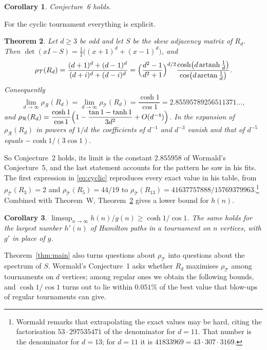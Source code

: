 \documentclass[11pt,a4paper,reqno]{amsart}
\newtheorem{theorem}{Theorem}[section]
\newtheorem{corollary}[theorem]{Corollary}
\theoremstyle{remark}
\numberwithin{equation}{section}
\newcommand{\artanh}{\operatorname{artanh}}
\newcommand{\cT}{\mathcal{T}}
\newcommand{\cR}{\mathcal{R}}
\begin{document}
\begin{corollary}\label{cor:conj6}
Conjecture~6 holds.
\end{corollary}

For the cyclic tournament everything is explicit.

\begin{theorem}\label{thm:cyclic}
Let $d\ge3$ be odd and let $S$ be the skew adjacency matrix of $R_d$. Then $\det(xI-S)=\tfrac12\bigl((x+1)^d+(x-1)^d\bigr)$, and
\begin{equation}\label{eq:cyclic}
\rho_\cT(R_d)=\frac{(d+1)^d+(d-1)^d}{(d+i)^d+(d-i)^d}
=\Bigl(\frac{d^2-1}{d^2+1}\Bigr)^{d/2}\frac{\cosh\bigl(d\artanh\frac1d\bigr)}{\cos\bigl(d\arctan\frac1d\bigr)}.
\end{equation}
Consequently
\[
\lim_{d\to\infty}\rho_\cR(R_d)=\lim_{d\to\infty}\rho_\cT(R_d)=\frac{\cosh 1}{\cos 1}=2.85595789256511371\ldots,
\]
and $\rho_\cR(R_d)=\dfrac{\cosh1}{\cos1}\Bigl(1-\dfrac{\tan1-\tanh1}{3d^2}+O(d^{-4})\Bigr)$. In the expansion of $\rho_\cR(R_d)$ in powers of $1/d$ the coefficients of $d^{-1}$ and $d^{-3}$ vanish and that of $d^{-5}$ equals $-\cosh1/(3\cos1)$.
\end{theorem}

So Conjecture~2 holds, its limit is the constant $2.855958$ of Wormald's Conjecture~5, and the last statement accounts for the pattern he saw in his fits. The first expression in \eqref{eq:cyclic} reproduces every exact value in his table, from $\rho_\cT(R_3)=2$ and $\rho_\cT(R_5)=44/19$ to $\rho_\cT(R_{13})=41637757888/15769379963$.\footnote{Wormald remarks that extrapolating the exact values may be hard, citing the factorisation $53\cdot297535471$ of the denominator for $d=11$. That number is the denominator for $d=13$; for $d=11$ it is $41833969=43\cdot307\cdot3169$.} Combined with Theorem~W, Theorem~\ref{thm:cyclic} gives a lower bound for $h(n)$.

\begin{corollary}\label{cor:hn}
$\limsup_{n\to\infty}h(n)/g(n)\ge\cosh1/\cos1$. The same holds for the largest number $h'(n)$ of Hamilton paths in a tournament on $n$ vertices, with $g'$ in place of $g$.
\end{corollary}

Theorem~\ref{thm:main} also turns questions about $\rho_\cT$ into questions about the spectrum of $S$. Wormald's Conjecture~1 asks whether $R_d$ maximises $\rho_\cT$ among tournaments on $d$ vertices; among regular ones we obtain the following bounds, and $\cosh1/\cos1$ turns out to lie within $0.051\%$ of the best value that blow-ups of regular tournaments can give.
\end{document}
